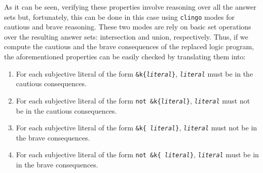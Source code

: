 \documentclass{new_tlp}
\newcommand{\textapprox}{\raisebox{0.5ex}{\texttildelow}}
\def\clingo{{\tt clingo}}
\begin{document}
As it can be seen, verifying these properties involve reasoning over all the answer sets but, fortunately, this can be done in this case using \clingo{} modes for cautious and brave reasoning. These two modes are rely on basic set operations over the resulting answer sets: intersection and union, respectively. Thus, if we compute the cautious and the brave consequences of the replaced logic program, the aforementioned properties can be easily checked by translating them into:
\begin{enumerate}
    \item For each subjective literal of the form \texttt{\&k\{\emph{literal}\}}, \texttt{\emph{literal}} must be in the cautious consequences.

    \item For each subjective literal of the form \texttt{not \&k\{\emph{literal}\}}, \texttt{\emph{literal}} must not be in the cautious consequences.

    \item For each subjective literal of the form \texttt{\&k\{\textapprox\ \emph{literal}\}}, \texttt{\emph{literal}} must not be in the brave consequences.

    \item For each subjective literal of the form \texttt{not \&k\{\textapprox\ \emph{literal}\}}, \texttt{\emph{literal}} must be in in the brave consequences.
\end{enumerate}
\end{document}
